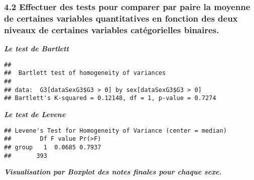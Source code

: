\documentclass[
]{article}
\newenvironment{Shaded}{\begin{snugshade}}{\end{snugshade}}
\newcommand{\DataTypeTok}[1]{\textcolor[rgb]{0.13,0.29,0.53}{#1}}
\newcommand{\DecValTok}[1]{\textcolor[rgb]{0.00,0.00,0.81}{#1}}
\newcommand{\KeywordTok}[1]{\textcolor[rgb]{0.13,0.29,0.53}{\textbf{#1}}}
\newcommand{\NormalTok}[1]{#1}
\newcommand{\OperatorTok}[1]{\textcolor[rgb]{0.81,0.36,0.00}{\textbf{#1}}}
\newcommand{\StringTok}[1]{\textcolor[rgb]{0.31,0.60,0.02}{#1}}
\begin{document}
\hypertarget{effectuer-des-tests-pour-comparer-par-paire-la-moyenne-de-certaines-variables-quantitatives-en-fonction-des-deux-niveaux-de-certaines-variables-catuxe9gorielles-binaires.}{%
\subsubsection{4.2 Effectuer des tests pour comparer par paire la
moyenne de certaines variables quantitatives en fonction des deux
niveaux de certaines variables catégorielles
binaires.}\label{effectuer-des-tests-pour-comparer-par-paire-la-moyenne-de-certaines-variables-quantitatives-en-fonction-des-deux-niveaux-de-certaines-variables-catuxe9gorielles-binaires.}}

\textbf{\emph{Le test de Bartlett}}

\begin{Shaded}
\end{Shaded}

\begin{verbatim}
## 
##  Bartlett test of homogeneity of variances
## 
## data:  G3[dataSexG3$G3 > 0] by sex[dataSexG3$G3 > 0]
## Bartlett's K-squared = 0.12148, df = 1, p-value = 0.7274
\end{verbatim}

\textbf{\emph{Le test de Levene}}

\begin{Shaded}
\end{Shaded}

\begin{verbatim}
## Levene's Test for Homogeneity of Variance (center = median)
##        Df F value Pr(>F)
## group   1  0.0685 0.7937
##       393
\end{verbatim}

\textbf{\emph{Visualisation par Boxplot des notes finales pour chaque
sexe.}}
\end{document}
